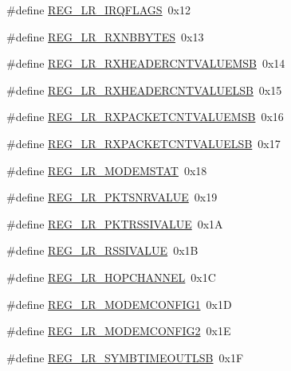 \begin{DoxyCompactItemize}
\item 
\#define \hyperlink{sx1276Regs-LoRa_8h_a29222ef4f73d911623275ebbb7ddbaf0}{R\+E\+G\+\_\+\+L\+R\+\_\+\+I\+R\+Q\+F\+L\+A\+GS}~0x12
\item 
\#define \hyperlink{sx1276Regs-LoRa_8h_a5443dae2a149465cebef0aa8aad4d8aa}{R\+E\+G\+\_\+\+L\+R\+\_\+\+R\+X\+N\+B\+B\+Y\+T\+ES}~0x13
\item 
\#define \hyperlink{sx1276Regs-LoRa_8h_aaf42f47bffbc4e33e7a4a10a81aee5e7}{R\+E\+G\+\_\+\+L\+R\+\_\+\+R\+X\+H\+E\+A\+D\+E\+R\+C\+N\+T\+V\+A\+L\+U\+E\+M\+SB}~0x14
\item 
\#define \hyperlink{sx1276Regs-LoRa_8h_a8153ac7c0d03f1c769485b112383a733}{R\+E\+G\+\_\+\+L\+R\+\_\+\+R\+X\+H\+E\+A\+D\+E\+R\+C\+N\+T\+V\+A\+L\+U\+E\+L\+SB}~0x15
\item 
\#define \hyperlink{sx1276Regs-LoRa_8h_aab224430e41cf39e050a92927b8a2e03}{R\+E\+G\+\_\+\+L\+R\+\_\+\+R\+X\+P\+A\+C\+K\+E\+T\+C\+N\+T\+V\+A\+L\+U\+E\+M\+SB}~0x16
\item 
\#define \hyperlink{sx1276Regs-LoRa_8h_a999636679ece11f0f6cb0ad058db863a}{R\+E\+G\+\_\+\+L\+R\+\_\+\+R\+X\+P\+A\+C\+K\+E\+T\+C\+N\+T\+V\+A\+L\+U\+E\+L\+SB}~0x17
\item 
\#define \hyperlink{sx1276Regs-LoRa_8h_ac633e60a75224b850dc8429394e80e7c}{R\+E\+G\+\_\+\+L\+R\+\_\+\+M\+O\+D\+E\+M\+S\+T\+AT}~0x18
\item 
\#define \hyperlink{sx1276Regs-LoRa_8h_a2b0bc71a6460bd6e97cf8a6717c90cc5}{R\+E\+G\+\_\+\+L\+R\+\_\+\+P\+K\+T\+S\+N\+R\+V\+A\+L\+UE}~0x19
\item 
\#define \hyperlink{sx1276Regs-LoRa_8h_ac7db39cc10de754e5e5d7065ca2c1796}{R\+E\+G\+\_\+\+L\+R\+\_\+\+P\+K\+T\+R\+S\+S\+I\+V\+A\+L\+UE}~0x1A
\item 
\#define \hyperlink{sx1276Regs-LoRa_8h_a51636b899dd268fa04ddfa2c66329f05}{R\+E\+G\+\_\+\+L\+R\+\_\+\+R\+S\+S\+I\+V\+A\+L\+UE}~0x1B
\item 
\#define \hyperlink{sx1276Regs-LoRa_8h_a5eb22acab75323e171815532117539e4}{R\+E\+G\+\_\+\+L\+R\+\_\+\+H\+O\+P\+C\+H\+A\+N\+N\+EL}~0x1C
\item 
\#define \hyperlink{sx1276Regs-LoRa_8h_af759d830088be4284079ba8aa75d98ae}{R\+E\+G\+\_\+\+L\+R\+\_\+\+M\+O\+D\+E\+M\+C\+O\+N\+F\+I\+G1}~0x1D
\item 
\#define \hyperlink{sx1276Regs-LoRa_8h_ae96f87f817a89b1240cfdc89f17b6e30}{R\+E\+G\+\_\+\+L\+R\+\_\+\+M\+O\+D\+E\+M\+C\+O\+N\+F\+I\+G2}~0x1E
\item 
\#define \hyperlink{sx1276Regs-LoRa_8h_a7759fc860cf446c7e1a92a823a89ea31}{R\+E\+G\+\_\+\+L\+R\+\_\+\+S\+Y\+M\+B\+T\+I\+M\+E\+O\+U\+T\+L\+SB}~0x1F

\end{DoxyCompactItemize}
